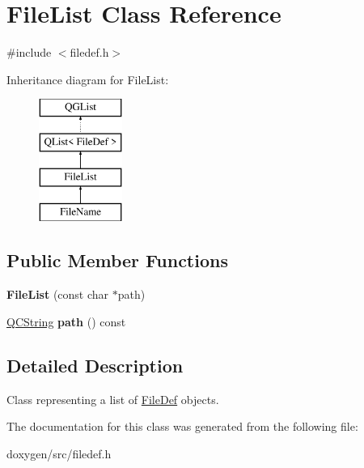 \hypertarget{class_file_list}{}\section{File\+List Class Reference}
\label{class_file_list}


{\ttfamily \#include $<$filedef.\+h$>$}

Inheritance diagram for File\+List\+:\begin{figure}[H]
\begin{center}
\leavevmode
\includegraphics[height=4.000000cm]{class_file_list}
\end{center}
\end{figure}
\subsection*{Public Member Functions}
\begin{DoxyCompactItemize}
\item 
\mbox{\label{class_file_list_ab70cb98af26049caad6f8e6123a5aed1}} 
{\bfseries File\+List} (const char $\ast$path)
\item 
\mbox{\label{class_file_list_a3d12c332bb0b27001c55220e1e75df54}} 
\mbox{\hyperlink{class_q_c_string}{Q\+C\+String}} {\bfseries path} () const
\end{DoxyCompactItemize}


\subsection{Detailed Description}
Class representing a list of \mbox{\hyperlink{class_file_def}{File\+Def}} objects. 

The documentation for this class was generated from the following file\+:\begin{DoxyCompactItemize}
\item 
doxygen/src/filedef.\+h\end{DoxyCompactItemize}
